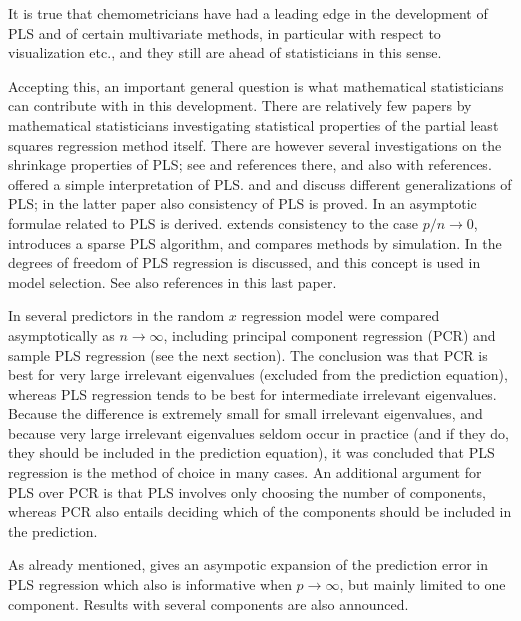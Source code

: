 \documentclass[num-refs]{wiley-article}
\begin{document}
It is true that chemometricians have had a leading edge in the development of PLS and of certain multivariate methods, in particular with respect to visualization etc., and they still are ahead of statisticians in this sense.

Accepting this, an important general question is what mathematical statisticians can contribute with in this development.
There are relatively few papers by mathematical statisticians
investigating statistical properties of the partial least squares regression
method itself. There are however several investigations on the shrinkage
properties of PLS; see \citet{kramer2007overview} and references there, and also \citet{foschigeometry} with references.  \citet{garthwaite1994interpretation} offered a simple interpretation of PLS. \citet{stone1990continuum} and  and \citet{naik2000partial} discuss different generalizations of PLS; in the latter paper also consistency of PLS is proved. In  \citet{stoica1998partial} an asymptotic formulae related to PLS is derived. \citet{chun2010sparse} extends consistency to the case $p/n\rightarrow 0$, introduces a sparse PLS algorithm, and compares methods by simulation. In \citet{kramer2012degrees} the degrees of freedom of PLS regression is discussed, and this concept is used in model selection. See also references in this last paper.

In \citet{helland1994comparison} several predictors in the random $x$ regression model were compared asymptotically as $n\rightarrow\infty$, including principal component regression (PCR) and sample PLS regression (see the next section). The conclusion was that PCR is best for very large irrelevant eigenvalues (excluded from the prediction equation), whereas PLS regression tends to be best for intermediate irrelevant eigenvalues. Because the difference is extremely small for small irrelevant eigenvalues, and because very large irrelevant eigenvalues seldom occur in practice (and if they do, they should be included in the prediction equation), it was concluded that PLS regression is the method of choice in many cases. An additional argument for PLS over PCR is that PLS involves only choosing the number of components, whereas PCR also entails deciding which of the components should be included in the prediction.

As already mentioned, \citet{cook2017pls} gives an asympotic expansion of the prediction error in PLS regression which also is informative when $p\rightarrow\infty$, but mainly limited to one component. Results with several components are also announced.
 
\end{document}
